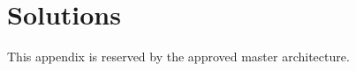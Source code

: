 \chapter{Solutions}
\label{app:solutions}

This appendix is reserved by the approved master architecture.

